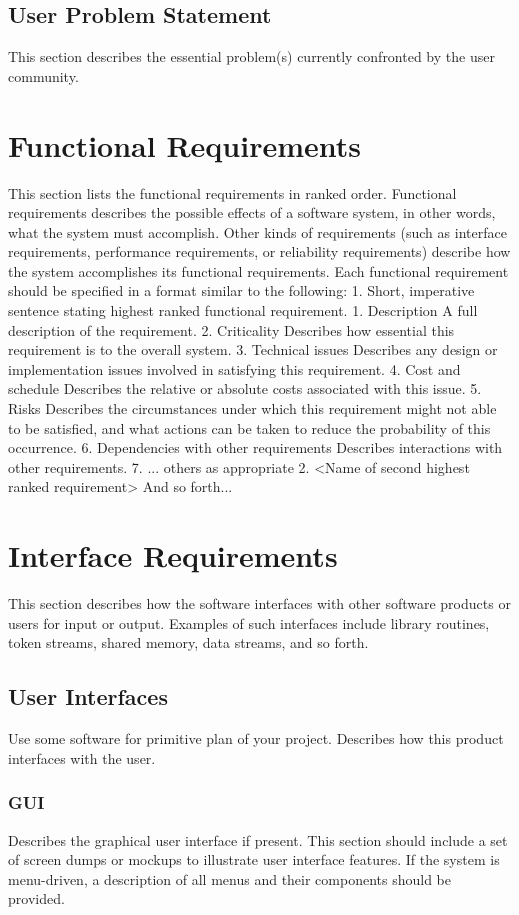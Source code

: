 \documentclass[]{article}
\begin{document}
\subsection{ User Problem Statement}
This section describes the essential problem(s) currently confronted by the user community. 

\section{Functional Requirements}
This section lists the functional requirements in ranked order. Functional requirements describes the possible effects of a software system, in other words, what the system must accomplish. Other kinds of requirements (such as interface requirements, performance requirements, or reliability requirements) describe how the system accomplishes its functional requirements. Each functional requirement should be specified in a format similar to the following: 
1.	Short, imperative sentence stating highest ranked functional requirement.
1.	Description
A full description of the requirement. 
2.	Criticality
Describes how essential this requirement is to the overall system. 
3.	Technical issues
Describes any design or implementation issues involved in satisfying this requirement. 
4.	Cost and schedule
Describes the relative or absolute costs associated with this issue. 
5.	Risks
Describes the circumstances under which this requirement might not able to be satisfied, and what actions can be taken to reduce the probability of this occurrence. 
6.	Dependencies with other requirements
Describes interactions with other requirements. 
7.	... others as appropriate
2.	<Name of second highest ranked requirement>
And so forth... 

\section{Interface Requirements}
This section describes how the software interfaces with other software products or users for input or output. Examples of such interfaces include library routines, token streams, shared memory, data streams, and so forth. 

\subsection{User Interfaces}
Use some software for primitive plan of your project.
Describes how this product interfaces with the user. 

\subsubsection {GUI}
Describes the graphical user interface if present. This section should include a set of screen dumps or mockups to illustrate user interface features. 
If the system is menu-driven, a description of all menus and their components should be provided. 
\end{document}
